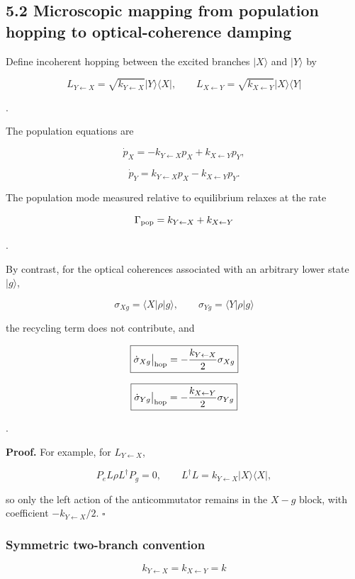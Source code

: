 \documentclass[
  10pt,
  a4paper,
]{article}
\begin{document}
\subsection{5.2 Microscopic mapping from population hopping to
optical-coherence
damping}\label{microscopic-mapping-from-population-hopping-to-optical-coherence-damping}

Define incoherent hopping between the excited branches \(|X\rangle\) and
\(|Y\rangle\) by

\[
L_{Y\leftarrow X}
=\sqrt{k_{Y\leftarrow X}}|Y\rangle\langle X|,
\qquad
L_{X\leftarrow Y}
=\sqrt{k_{X\leftarrow Y}}|X\rangle\langle Y|
\]

.

The population equations are

\[
\dot p_X
=-k_{Y\leftarrow X}p_X
+k_{X\leftarrow Y}p_Y,
\]

\[
\dot p_Y
=k_{Y\leftarrow X}p_X
-k_{X\leftarrow Y}p_Y.
\]

The population mode measured relative to equilibrium relaxes at the rate

\[
\Gamma_{\rm pop}
=k_{Y\leftarrow X}+k_{X\leftarrow Y}
\]

.

By contrast, for the optical coherences associated with an arbitrary
lower state \(|g\rangle\),

\[
\sigma_{Xg}=\langle X|\rho|g\rangle,
\qquad
\sigma_{Yg}=\langle Y|\rho|g\rangle
\]

the recycling term does not contribute, and

\[
\boxed{
\dot\sigma_{Xg}\big|_{\rm hop}
=-\frac{k_{Y\leftarrow X}}{2}\sigma_{Xg}
}
\]

\[
\boxed{
\dot\sigma_{Yg}\big|_{\rm hop}
=-\frac{k_{X\leftarrow Y}}{2}\sigma_{Yg}
}
\]

.

\textbf{Proof.} For example, for \(L_{Y\leftarrow X}\),

\[
P_eL\rho L^\dagger P_g=0,
\qquad
L^\dagger L=k_{Y\leftarrow X}|X\rangle\langle X|,
\]

so only the left action of the anticommutator remains in the \(X-g\)
block, with coefficient \(-k_{Y\leftarrow X}/2\). \(\square\)

\subsubsection{Symmetric two-branch
convention}\label{symmetric-two-branch-convention}

\[
k_{Y\leftarrow X}=k_{X\leftarrow Y}=k
\]
\end{document}

